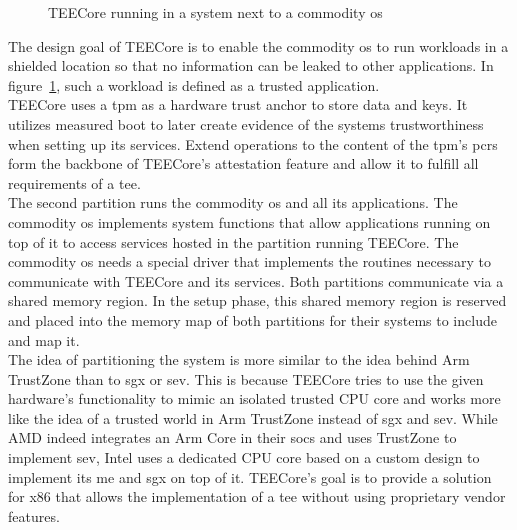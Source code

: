 \label{sec:30:system_overview}
\begin{figure}
  \begin{center}
    
    \caption{TEECore running in a system next to a commodity \gls{os}}
    \label{fig:30:tee_system_design}
  \end{center}
\end{figure}

The design goal of TEECore is to enable the commodity \gls{os} to run workloads
in a shielded location so that no information can be leaked to other
applications. In figure~\ref{fig:30:tee_system_design}, such a workload is
defined as a trusted application.\\

TEECore uses a \gls{tpm} as a hardware trust anchor to store data and keys. It
utilizes measured boot to later create evidence of the systems trustworthiness
when setting up its services. Extend operations to the content of the
\gls{tpm}'s \glspl{pcr} form the backbone of TEECore's attestation feature and
allow it to fulfill all requirements of a \gls{tee}.\\

The second partition runs the commodity \gls{os} and all its applications. The
commodity \gls{os} implements system functions that allow applications running
on top of it to access services hosted in the partition running TEECore. The
commodity \gls{os} needs a special driver that implements the routines necessary
to communicate with TEECore and its services. Both partitions communicate via a
shared memory region. In the setup phase, this shared memory region is reserved
and placed into the memory map of both partitions for their systems to include
and map it.\\

The idea of partitioning the system is more similar to the idea behind Arm
TrustZone than to \gls{sgx} or \gls{sev}. This is because TEECore
tries to use the given hardware's functionality to mimic an isolated trusted CPU
core and works more like the idea of a trusted world in Arm TrustZone instead of
\gls{sgx} and \gls{sev}. While AMD indeed integrates an Arm Core in their
\glspl{soc} and uses TrustZone to implement \gls{sev}, Intel uses a dedicated
CPU core based on a custom design to implement its \gls{me} and
\gls{sgx} on top of it. TEECore's goal is to provide a solution for
x86 that allows the implementation of a \gls{tee} without using proprietary
vendor features.


